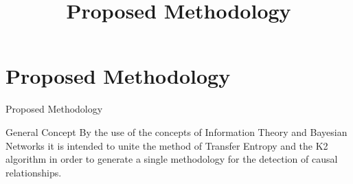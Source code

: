 \section{Proposed Methodology}
\title{Proposed Methodology}
\begin{frame}{Proposed Methodology}

	    
    	
    

    \begin{block}{General Concept}
        By the use of the concepts of Information Theory and Bayesian Networks it is intended to unite the method of Transfer Entropy and the K2 algorithm in order to generate a single methodology for the detection of causal relationships.
    \end{block}
\end{frame}
